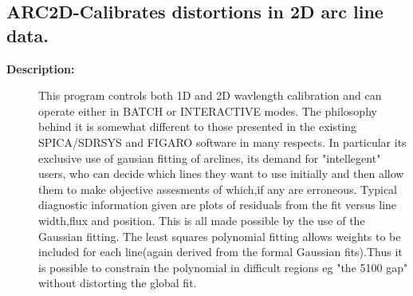 \subsection{ARC2D-\label{ARC2D}Calibrates distortions in 2D arc line data.}
\begin{description}

\item [\textbf{Description:}]
   This program controls both 1D and 2D wavlength calibration and
   can operate either in BATCH or INTERACTIVE modes.
   The philosophy behind it is somewhat different to those presented
   in the existing SPICA/SDRSYS and FIGARO software in many respects.
   In particular its exclusive use of gausian fitting of arclines, its
   demand for "intellegent" users, who can decide which lines they want
   to use initially and then allow them to make objective assesments of
   which,if any are erroneous. Typical diagnostic information given are
   plots of residuals from the fit versus line width,flux and position.
   This is all made possible by the use of the Gaussian fitting.
     The least squares polynomial fitting allows weights to be included
   for each line(again derived from the formal Gaussian fits).Thus it
   is possible to constrain the polynomial in difficult regions
   eg "the 5100 gap" without distorting the global fit.


\end{description}
